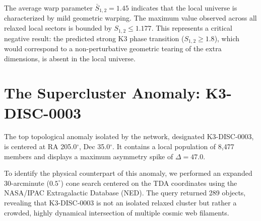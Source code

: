\documentclass[aps,prd,twocolumn,nofootinbib,superscriptaddress,10pt]{revtex4-2}
\begin{document}
The average warp parameter $\bar{S}_{1,2} = 1.45$ indicates that the local universe is characterized by mild geometric warping. The maximum value observed across all relaxed local sectors is bounded by $S_{1,2} \le 1.177$. This represents a critical negative result: the predicted strong K3 phase transition ($S_{1,2} \ge 1.8$), which would correspond to a non-perturbative geometric tearing of the extra dimensions, is absent in the local universe.

\section{The Supercluster Anomaly: K3-DISC-0003}

The top topological anomaly isolated by the network, designated K3-DISC-0003, is centered at RA 205.0$^\circ$, Dec 35.0$^\circ$. It contains a local population of 8,477 members and displays a maximum asymmetry spike of $\Delta = 47.0$. 

To identify the physical counterpart of this anomaly, we performed an expanded 30-arcminute ($0.5^\circ$) cone search centered on the TDA coordinates using the NASA/IPAC Extragalactic Database (NED). The query returned 289 objects, revealing that K3-DISC-0003 is not an isolated relaxed cluster but rather a crowded, highly dynamical intersection of multiple cosmic web filaments.
\end{document}
